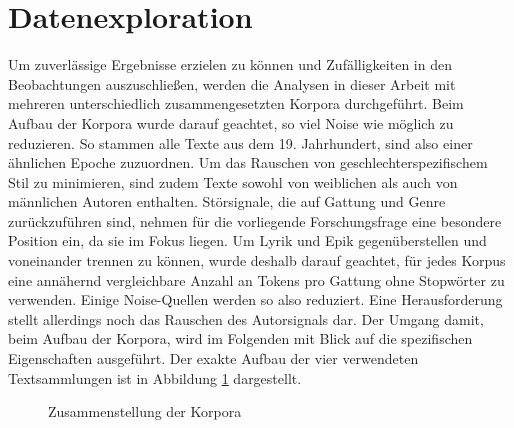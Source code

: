 \documentclass[a4paper,10p]{article}
\begin{document}
\section{ Datenexploration}

Um zuverlässige Ergebnisse erzielen zu können und Zufälligkeiten in den Beobachtungen auszuschließen, werden die Analysen in dieser Arbeit mit mehreren unterschiedlich zusammengesetzten Korpora durchgeführt. Beim Aufbau der Korpora wurde darauf geachtet, so viel Noise wie möglich zu reduzieren. So stammen alle Texte aus dem 19. Jahrhundert, sind also einer ähnlichen Epoche zuzuordnen. Um das Rauschen von geschlechterspezifischem Stil zu minimieren, sind zudem Texte sowohl von weiblichen als auch von männlichen Autoren enthalten. Störsignale, die auf Gattung und Genre zurückzuführen sind, nehmen für die vorliegende Forschungsfrage eine besondere Position ein, da sie im Fokus liegen. Um Lyrik und Epik gegenüberstellen und voneinander trennen zu können, wurde deshalb darauf geachtet, für jedes Korpus eine annähernd vergleichbare Anzahl an Tokens pro Gattung ohne Stopwörter zu verwenden. Einige Noise-Quellen werden so also reduziert. Eine Herausforderung stellt allerdings noch das Rauschen des Autorsignals dar. Der Umgang damit, beim Aufbau der Korpora, wird im Folgenden mit Blick auf die spezifischen Eigenschaften ausgeführt. Der exakte Aufbau der vier verwendeten Textsammlungen ist in Abbildung \ref{fig:Zusammenstellung_Korpora} dargestellt.


\begin{figure}[h]
	\begin{center}
\end{center}
\caption{Zusammenstellung der Korpora}
\label{fig:Zusammenstellung_Korpora}
\end{figure}
\end{document}
